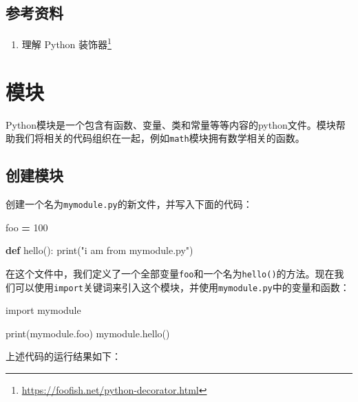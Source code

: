 \documentclass[]{ctexbook}
\newenvironment{Shaded}{\begin{snugshade}}{\end{snugshade}}
\newcommand{\BuiltInTok}[1]{#1}
\newcommand{\DecValTok}[1]{\textcolor[rgb]{0.00,0.00,0.81}{#1}}
\newcommand{\ImportTok}[1]{#1}
\newcommand{\KeywordTok}[1]{\textcolor[rgb]{0.13,0.29,0.53}{\textbf{#1}}}
\newcommand{\NormalTok}[1]{#1}
\newcommand{\OperatorTok}[1]{\textcolor[rgb]{0.81,0.36,0.00}{\textbf{#1}}}
\newcommand{\StringTok}[1]{\textcolor[rgb]{0.31,0.60,0.02}{#1}}
\providecommand{\tightlist}{%
  \setlength{\itemsep}{0pt}\setlength{\parskip}{0pt}}
\renewcommand{\href}[2]{#2\footnote{\url{#1}}}
\begin{document}
\hypertarget{ux53c2ux8003ux8d44ux6599-1}{%
\section*{参考资料}\label{ux53c2ux8003ux8d44ux6599-1}}


\begin{enumerate}
\def\labelenumi{\arabic{enumi}.}
\tightlist
\item
  \href{https://foofish.net/python-decorator.html}{理解 Python 装饰器}
\end{enumerate}

\hypertarget{module}{%
\chapter{模块}\label{module}}

Python模块是一个包含有函数、变量、类和常量等等内容的python文件。模块帮助我们将相关的代码组织在一起，例如\texttt{math}模块拥有数学相关的函数。

\hypertarget{ux521bux5efaux6a21ux5757}{%
\section{创建模块}\label{ux521bux5efaux6a21ux5757}}

创建一个名为\texttt{mymodule.py}的新文件，并写入下面的代码：

\begin{Shaded}
\begin{Highlighting}[]
\NormalTok{foo }\OperatorTok{=} \DecValTok{100}

\KeywordTok{def}\NormalTok{ hello():}
    \BuiltInTok{print}\NormalTok{(}\StringTok{"i am from mymodule.py"}\NormalTok{)}
\end{Highlighting}
\end{Shaded}

在这个文件中，我们定义了一个全部变量\texttt{foo}和一个名为\texttt{hello()}的方法。现在我们可以使用\texttt{import}关键词来引入这个模块，并使用\texttt{mymodule.py}中的变量和函数：

\begin{Shaded}
\begin{Highlighting}[]
\ImportTok{import}\NormalTok{ mymodule}

\BuiltInTok{print}\NormalTok{(mymodule.foo)}
\NormalTok{mymodule.hello()}
\end{Highlighting}
\end{Shaded}

上述代码的运行结果如下：
\end{document}
